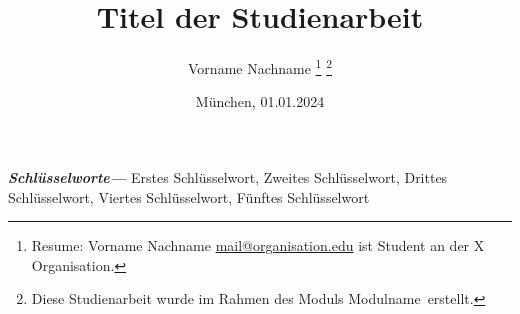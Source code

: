 \title{Titel der Studienarbeit}
\author{
    Vorname Nachname
    \thanks{Resume: Vorname Nachname \href{mailto:mail@organisation.edu}{mail@organisation.edu} ist Student an der X Organisation.}%
    \thanks{Diese Studienarbeit wurde im Rahmen des Moduls \glqq Modulname\grqq\ erstellt.}%
}
\date{München, 01.01.2024}
\maketitle

\vspace{-1cm} %



\providecommand{\keywords}[1]
{
  \small	
  \textbf{\textit{Schlüsselworte---}} #1
}
\keywords{
    Erstes Schlüsselwort, Zweites Schlüsselwort, Drittes Schlüsselwort, Viertes Schlüsselwort, Fünftes Schlüsselwort
}
